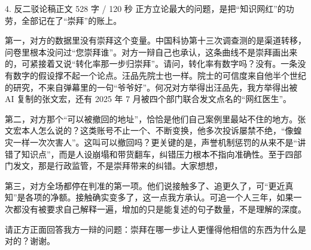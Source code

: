 \documentclass[script,con]{debate}
\begin{document}
\begin{speech}{4. 反二驳论稿}{正文 528 字 / 120 秒}
正方立论最大的问题，是把“知识网红”的功劳，全部记在了“崇拜”的账上。

第一，对方的数据里没有崇拜这个变量。中国科协第十三次调查测的是渠道转移，问卷里根本没问过“您崇拜谁”。对方一辩自己也承认，这条曲线不是崇拜画出来的，可紧接着又说“转化率那一步归崇拜”。请问，转化率有数字吗？没有。一条没有数字的假设撑不起一个论点。汪品先院士也一样。院士的可信度来自他半个世纪的研究，不来自弹幕里的一句“爷爷好”。何况对方举得出汪品先，我方举得出被 AI 复制的张文宏，还有 2025 年 7 月被四个部门联合发文点名的“网红医生”。

第二，对方那个“可以被撤回的地址”，恰恰是他们自己案例里最站不住的地方。张文宏本人怎么说的？这类账号不止一个、不断变换，他多次投诉屡禁不绝，“像蝗灾一样一次次害人”。这叫可以撤回吗？更关键的是，声誉机制惩罚的从来不是“讲错了知识点”，而是人设崩塌和带货翻车，纠错压力根本不指向准确性。至于四部门发文，那是行政监管，不是崇拜带来的纠错。大家想想，

第三，对方全场都停在判准的第一项。他们说接触多了、追更久了，可“更近真知”是各项的净额。接触确实变多了，这一点我方承认。可追一个人三年，如果一次都没有被要求自己解释一遍，增加的只是能复述的句子数量，不是理解的深度。

请正方正面回答我方一辩的问题：崇拜在哪一步让人更懂得他相信的东西为什么是对的？谢谢。

\begin{contingency}
\end{contingency}
\end{speech}
\end{document}
